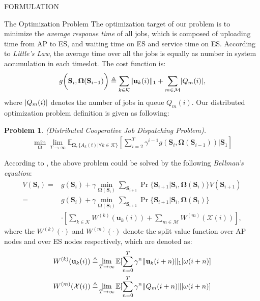 \documentclass[10pt, conference, letterpaper]{IEEEtran}
\newtheorem{problem}{Problem}
\newcommand{\define}{\triangleq}
\renewcommand{\vec}{\mathbf}
\DeclarePairedDelimiter{\norm}{|}{|}
\DeclarePairedDelimiter{\Inorm}{\|}{\|_1}
\newcommand{\apSet}{\mathcal{K}}
\newcommand{\esSet}{\mathcal{M}}
\newcommand{\Stat}{\mathbf{S}}
\newcommand{\Obsv}{\mathcal{X}}
\newcommand{\Policy}{\mathbf{\Omega}}
\begin{document}
\begin{section}{FORMULATION}
        \begin{subsection}{The Optimization Problem}
            The optimization target of our problem is to minimize the \emph{average response time} of all jobs, which is composed of uploading time from AP to ES, and waiting time on ES and service time on ES. According to \emph{Little's Law}, the average time over all the jobs is equally as number in system accumulation in each timeslot. The cost function is:
            \begin{align}
                g \bigg( \Stat_{i}, \Policy(\Stat_{i-1}) \bigg) \define \sum_{k\in\apSet} \Inorm{\vec{u}_{k}(i)} + \sum_{m\in\esSet} \norm{Q_m(i)},
            \end{align}
            where $\norm{Q_m(i)}$ denotes the number of jobs in queue $Q_m(i)$.
            Our distributed optimization problem definition is given as following:
            \begin{problem}
                (Distributed Cooperative Job Dispatching Problem).
                \begin{gather}
                    \min_{\Policy} \lim_{T \to \infty}
                        \mathbb{E}_{\Policy, \{A_k(t)|\forall k\in\apSet\}}
                            [\sum_{i=2}^{T} \gamma^{i-1} g(\Stat_{i}, \Policy(\Stat_{i-1}))|\Stat_1]
                \end{gather}
            \end{problem}

            According to \cite{sutton1998introduction}, the above problem could be solved by the following \emph{Bellman's equation}:
            \begin{align}
                V(\Stat_{i}) =& g(\Stat_i) + \gamma \min_{\Policy(\Stat_{i})} \sum_{\Stat_{i+1}} \Pr\{ \Stat_{i+1}|\Stat_{i}, \Policy(\Stat_{i}) \} V(\Stat_{i+1})
                \nonumber\\
                =& g(\Stat_{i}) + \gamma \min_{\Policy(\Stat_{i})} \sum_{\Stat_{i+1}} \Pr\{ \Stat_{i+1}|\Stat_{i}, \Policy(\Stat_{i}) \}
                    \nonumber\\
                    & \cdot [\sum_{k\in\apSet} W^{(k)}(\vec{u}_k(i)) + \sum_{m\in\esSet} W^{(m)}(\Obsv(i))],
            \end{align}
            where the  $W^{(k)}(\cdot)$ and $W^{(m)}(\cdot)$ denote the split value function over AP nodes and over ES nodes respectively, which are denoted as:
            \begin{align}
                W^{(k)}(\vec{u}_k(i)) \define& \lim_{T\to\infty} \mathbb{E}[\sum_{n=0}^{T} \gamma^{n} \Inorm{\vec{u}_k(i+n)}|\omega(i+n)]
                \\
                W^{(m)}(\Obsv(i)) \define& \lim_{T\to\infty} \mathbb{E}[\sum_{n=0}^{T} \gamma^{n} \|Q_m(i+n)\| | \omega(i+n)]
            \end{align}


\end{subsection}
\end{section}
\end{document}
